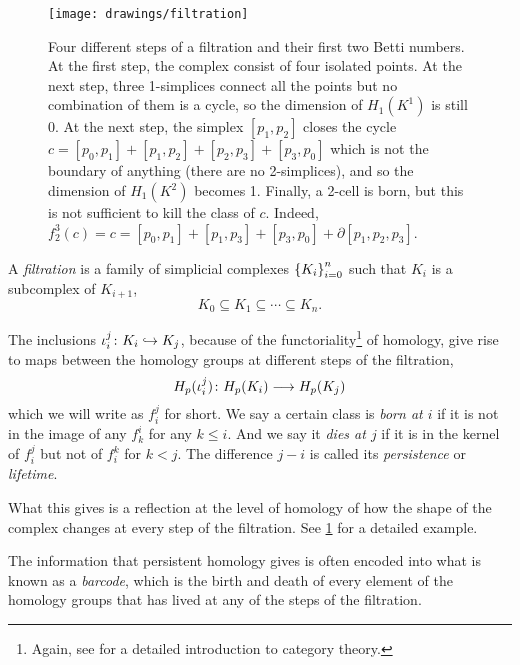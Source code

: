 \documentclass[../main.tex]{subfiles}
\begin{document}
\begin{figure}[htb]
	\centering
	\texttt{[image: drawings/filtration]}
	\caption{Four different steps of a filtration and their first two Betti numbers. At the
		first step, the complex consist of four isolated points. At the next step, three
		1-simplices connect all the points but no combination of them is a cycle, so the dimension
		of \( H_1(K^1) \) is still 0. At the next step, the simplex \( [p_1,p_2] \) closes the
		cycle \( c = [p_0,p_1] + [p_1,p_2] + [p_2,p_3] + [p_3,p_0] \)	which is not the boundary of
		anything (there are no 2-simplices), and so the dimension of \( H_1(K^2) \) becomes 1.
		Finally, a 2-cell is born, but this is not sufficient to kill the class of \( c \).
	Indeed, \( f_2^3(c) = c = [p_0,p_1] + [p_1,p_3] + [p_3,p_0] + \partial[p_1,p_2,p_3] \).}
	\label{fig:filtration}
\end{figure}

\begin{definition}[Filtration]
	A \emph{filtration} is a family of simplicial complexes \( \left\{ K_i \right\}_{i = 0}^n \)	such
	that \( K_i \) is a subcomplex of \( K_{i+1} \),
	\begin{equation*}
		K_0 \subseteq K_1 \subseteq \cdots \subseteq K_n.
	\end{equation*}
\end{definition}
The inclusions \( \iota_i^j \colon K_i \hookrightarrow K_j \), because of the
functoriality\footnote{Again, see \cite{riehl} for a detailed introduction to category
theory.} of homology, give rise to maps between the homology groups at different steps of
the filtration,
\begin{equation*}
	H_p(\iota_i^j) \colon H_p(K_i) \longrightarrow H_p(K_j)
\end{equation*}
which we will write as \( f_i^j \) for short. We say a certain class is \emph{born at \( i
\)} if it is not in the image of any \( f_k^i \) for any \( k \leq i \). And we say it
\emph{dies at \( j \)} if it is in the kernel of \( f_i^j \) but not of \( f_i^k \) for \(
k < j \). The difference \( j - i \) is called its \emph{persistence} or \emph{lifetime}. 

What this gives is a reflection at the level of homology of how the shape of the complex
changes at every step of the filtration. See \cref{fig:filtration} for a detailed example.

The information that persistent homology gives is often encoded into what is known as a
\emph{barcode}, which is the birth and death of every element of the homology groups that
has lived at any of the steps of the filtration. 
\end{document}
